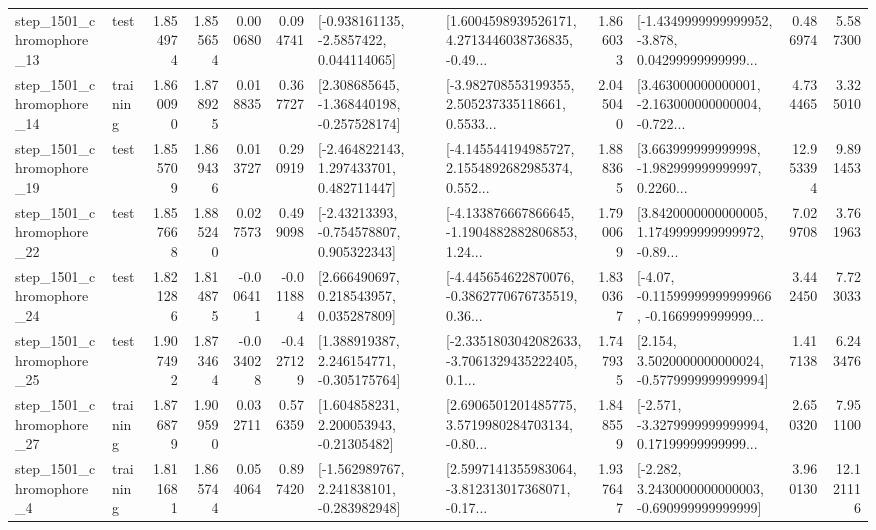\begin{tabular}{llrrrrllrlrr}
 step\_1501\_chromophore\_13 &      test &      1.854974 &    1.855654 &      0.000680 &  0.094741 &     [-0.938161135, -2.5857422, 0.044114065] &  [1.6004598939526171, 4.2713446038736835, -0.49... &       1.866033 &  [-1.4349999999999952, -3.878, 0.04299999999999... &            0.486974 &          5.587300 \\
 step\_1501\_chromophore\_14 &  training &      1.860090 &    1.878925 &      0.018835 &  0.367727 &   [2.308685645, -1.368440198, -0.257528174] &  [-3.982708553199355, 2.505237335118661, 0.5533... &       2.045040 &  [3.463000000000001, -2.163000000000004, -0.722... &            4.734465 &          3.325010 \\
 step\_1501\_chromophore\_19 &      test &      1.855709 &    1.869436 &      0.013727 &  0.290919 &    [-2.464822143, 1.297433701, 0.482711447] &  [-4.145544194985727, 2.1554892682985374, 0.552... &       1.888365 &  [3.663999999999998, -1.982999999999997, 0.2260... &           12.953394 &          9.891453 \\
 step\_1501\_chromophore\_22 &      test &      1.857668 &    1.885240 &      0.027573 &  0.499098 &    [-2.43213393, -0.754578807, 0.905322343] &  [-4.133876667866645, -1.1904882882806853, 1.24... &       1.790069 &  [3.8420000000000005, 1.1749999999999972, -0.89... &            7.029708 &          3.761963 \\
 step\_1501\_chromophore\_24 &      test &      1.821286 &    1.814875 &     -0.006411 & -0.011884 &     [2.666490697, 0.218543957, 0.035287809] &  [-4.445654622870076, -0.3862770676735519, 0.36... &       1.830367 &  [-4.07, -0.11599999999999966, -0.1669999999999... &            3.442450 &          7.723033 \\
 step\_1501\_chromophore\_25 &      test &      1.907492 &    1.873464 &     -0.034028 & -0.427129 &    [1.388919387, 2.246154771, -0.305175764] &  [-2.3351803042082633, -3.7061329435222405, 0.1... &       1.747935 &   [2.154, 3.5020000000000024, -0.5779999999999994] &            1.417138 &          6.243476 \\
 step\_1501\_chromophore\_27 &  training &      1.876879 &    1.909590 &      0.032711 &  0.576359 &     [1.604858231, 2.200053943, -0.21305482] &  [2.6906501201485775, 3.5719980284703134, -0.80... &       1.848559 &  [-2.571, -3.3279999999999994, 0.17199999999999... &            2.650320 &          7.951100 \\
  step\_1501\_chromophore\_4 &  training &      1.811681 &    1.865744 &      0.054064 &  0.897420 &   [-1.562989767, 2.241838101, -0.283982948] &  [2.5997141355983064, -3.812313017368071, -0.17... &       1.937647 &   [-2.282, 3.2430000000000003, -0.690999999999999] &            3.960130 &         12.121116 \\

\end{tabular}
